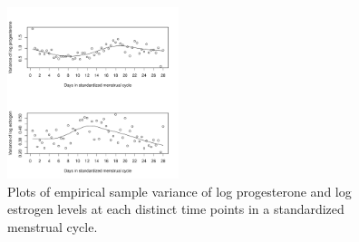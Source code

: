 \documentclass[12pt, notitlepage]{article}
\begin{document}
\begin{figure} 
\centering
\includegraphics[width=50mm]{bivLiuFig2.pdf}
\caption{Plots of empirical sample variance of log progesterone  and log estrogen levels at each distinct time points in a standardized menstrual cycle.}
\label{Liu2}
\end{figure}
\end{document}
